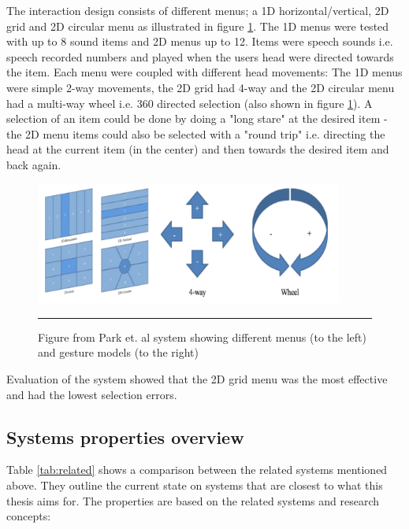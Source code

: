 The interaction design consists of different menus; a 1D horizontal/vertical, 2D grid and 2D circular menu as illustrated in figure \ref{fig:park-menus}. The 1D menus were tested with up to 8 sound items and 2D menus up to 12. Items were speech sounds i.e. speech recorded numbers and played when the users head were directed towards the item. Each menu were coupled with different head movements: The 1D menus were simple 2-way movements, the 2D grid had 4-way and the 2D circular menu had a multi-way wheel i.e. 360 directed selection (also shown in figure \ref{fig:park-menus}). A selection of an item could be done by doing a "long stare" at the desired item - the 2D menu items could also be selected with a "round trip" i.e. directing the head at the current item (in the center) and then towards the desired item and back again.

\begin{figure}[t]
	\centering
		\includegraphics[width=0.9\textwidth,height=\textheight,keepaspectratio]{./Figures/park-menus.png}
		\rule{35em}{0.5pt}
	\caption[Park menus]{Figure from Park et. al \cite{park_gaze-directed_2011} system showing different menus (to the left) and gesture models (to the right)}
	\label{fig:park-menus}
\end{figure}

Evaluation of the system showed that the 2D grid menu was the most effective and had the lowest selection errors.

\subsection{Systems properties overview}
Table \ref{tab:related} shows a comparison between the related systems mentioned above. They outline the current state on systems that are closest to what this thesis aims for. The properties are based on the related systems and research concepts:

